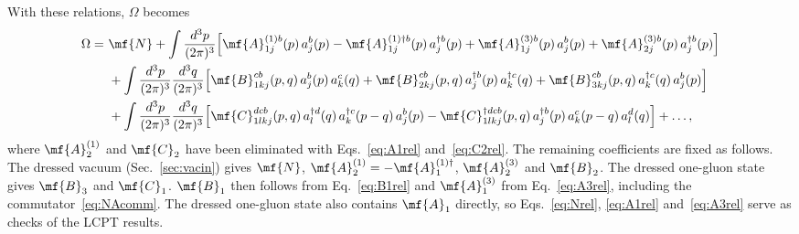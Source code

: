 With these relations, $\Omega$ becomes
\begin{align}\label{eq:OmegaConstrained}
\Omega=\ &\mf{N}
+\int\frac{d^3p}{(2\pi)^3}\Big[\mf{A}^{(1)b}_{1j}(p)\,a^{b}_{j}(p)-\mf{A}^{(1)\dagger b}_{1j}(p)\,a^{\dagger b}_{j}(p)
+\mf{A}^{(3)b}_{1j}(p)\,a^{b}_{j}(p)+\mf{A}^{(3)b}_{2j}(p)\,a^{\dagger b}_{j}(p)\Big]\notag\\
&+\int\frac{d^3p}{(2\pi)^3}\frac{d^3q}{(2\pi)^3}\Big[\mf{B}^{cb}_{1kj}(p,q)\,a^{b}_{j}(p)\,a^{c}_{k}(q)
+\mf{B}^{cb}_{2kj}(p,q)\,a^{\dagger b}_{j}(p)\,a^{\dagger c}_{k}(q)
+\mf{B}^{cb}_{3kj}(p,q)\,a^{\dagger c}_{k}(q)\,a^{b}_{j}(p)\Big]\notag\\
&+\int\frac{d^3p}{(2\pi)^3}\frac{d^3q}{(2\pi)^3}\Big[\mf{C}^{dcb}_{1lkj}(p,q)\,a^{\dagger d}_{l}(q)\,a^{\dagger c}_{k}(p-q)\,a^{b}_{j}(p)
-\mf{C}^{\dagger dcb}_{1lkj}(p,q)\,a^{\dagger b}_{j}(p)\,a^{c}_{k}(p-q)\,a^{d}_{l}(q)\Big]+\dots,
\end{align}
where $\mf{A}^{(1)}_{2}$ and $\mf{C}_{2}$ have been eliminated with Eqs.~\eqref{eq:A1rel} and~\eqref{eq:C2rel}.
The remaining coefficients are fixed as follows. The dressed vacuum (Sec.~\ref{sec:vacin}) gives $\mf{N}$,
$\mf{A}^{(1)}_{2}=-\mf{A}^{(1)\dagger}_{1}$, $\mf{A}^{(3)}_{2}$ and $\mf{B}_{2}$. The dressed one-gluon state
gives $\mf{B}_{3}$ and $\mf{C}_{1}$. $\mf{B}_{1}$ then follows from Eq.~\eqref{eq:B1rel} and $\mf{A}^{(3)}_{1}$
from Eq.~\eqref{eq:A3rel}, including the commutator~\eqref{eq:NAcomm}. The dressed one-gluon state also
contains $\mf{A}_{1}$ directly, so Eqs.~\eqref{eq:Nrel}, \eqref{eq:A1rel} and~\eqref{eq:A3rel} serve as
checks of the LCPT results.

